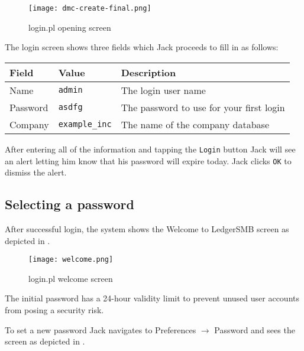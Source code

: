 \begin{figure}[h]
\centering
\texttt{[image: dmc-create-final.png]}
\caption{login.pl opening screen}
\label{fig:login-screen}
\end{figure}

The login screen shows three fields which Jack proceeds to fill in as follows:

\begin{longtable}{ llp{6cm} }
	Field & Value & Description \\ \hline
	\endhead
	Name & \texttt{admin} & The login user name\\
	Password & \texttt{asdfg} & The password to use for your first login\\
	Company & \texttt{example\_inc} & The name of the company database \\
\end{longtable}


After entering all of the information and tapping the \texttt{Login} button Jack will see an alert letting
him know that his password will expire today.  Jack clicks \texttt{OK} to dismiss the alert.

\subsection{Selecting a password}
\label{subsec-first-login-password}

After successful login, the system shows the Welcome to LedgerSMB  screen as depicted in
.

\begin{figure}[h]
	\centering
	\texttt{[image: welcome.png]}
	\caption{login.pl welcome screen}
	\label{fig:login-welcome-screen}
\end{figure}

The
initial password has a 24-hour validity limit to prevent unused user accounts from posing
a security risk.  

To set a new password Jack navigates to Preferences $\rightarrow$ Password and sees the 
screen as depicted in .

